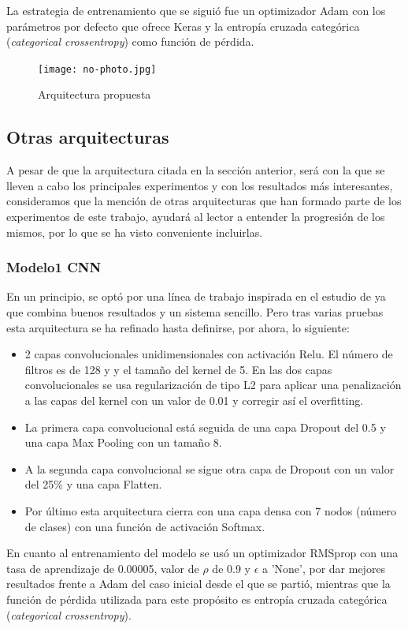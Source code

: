 \documentclass[11pt,a4paper,spanish]{book}
\begin{document}
		La estrategia de entrenamiento que se siguió fue un optimizador Adam con los parámetros por defecto que ofrece Keras y la entropía cruzada categórica (\emph{categorical crossentropy}) como función de pérdida.
		
		\begin{figure}[H]
			\centering
			\texttt{[image: no-photo.jpg]} 
			\caption{Arquitectura propuesta}
			\label{fig:lstm-cnn}
		\end{figure}
	
	
	\subsection{Otras arquitecturas}
	A pesar de que la arquitectura citada en la sección anterior, será con la que se lleven a cabo los principales experimentos y con los resultados más interesantes, consideramos que la mención de otras arquitecturas que han formado parte de los experimentos de este trabajo, ayudará al lector a entender la progresión de los mismos, por lo que se ha visto conveniente incluirlas.
	
		\subsubsection{Modelo1 CNN}
		En un principio, se optó por una línea de trabajo inspirada en el estudio de \cite{AbdulQayyum2019} ya que combina buenos resultados y un sistema sencillo. Pero tras varias pruebas esta arquitectura se ha refinado hasta definirse, por ahora, lo siguiente:
		
		\begin{itemize}
			\item 2 capas convolucionales unidimensionales con activación Relu. El número de filtros es de 128 y  y el tamaño del kernel de 5.
			En las dos capas convolucionales se usa regularización de tipo L2 para aplicar una penalización a las capas del kernel con un valor de 0.01 y corregir así el overfitting.
			
			\item La primera capa convolucional está seguida de una capa Dropout del 0.5 y una capa Max Pooling con un tamaño 8.
			
			\item A la segunda capa convolucional se sigue otra capa de Dropout con un valor del 25\% y una capa Flatten.
			
			\item Por último esta arquitectura cierra con una capa densa con 7 nodos (número de clases) con una función de activación Softmax.
		\end{itemize}
		En cuanto al entrenamiento del modelo se usó un optimizador RMSprop con una tasa de aprendizaje de 0.00005, valor de $\rho$ de 0.9 y $\epsilon$ a 'None', por dar mejores resultados frente a Adam del caso inicial desde el que se partió, mientras que la función de pérdida utilizada para este propósito es entropía cruzada categórica (\emph{categorical crossentropy}).\\
		
\end{document}
